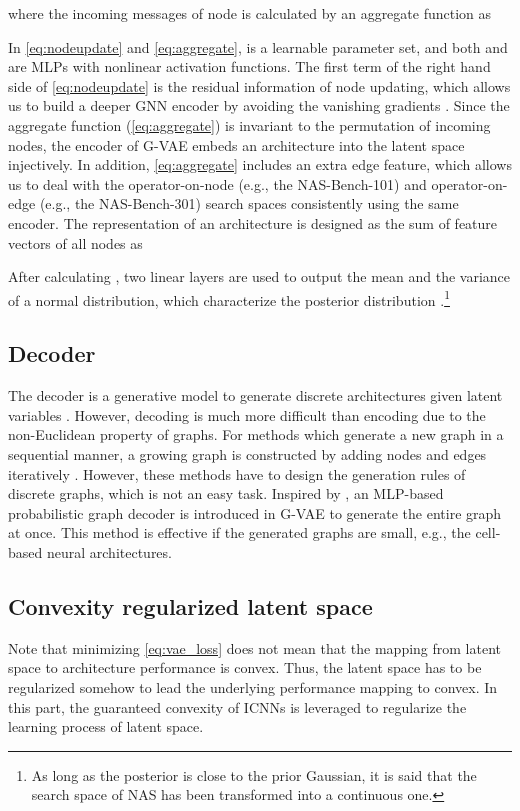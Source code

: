 \documentclass[10pt,twocolumn,letterpaper]{article}
\begin{document}
where the incoming messages  of node  is calculated by an aggregate function as

In \eqref{eq:nodeupdate} and \eqref{eq:aggregate},  is a learnable parameter set, and both  and  are MLPs with nonlinear activation functions. The first term of the right hand side of \eqref{eq:nodeupdate}  is the residual information of node updating, which allows us to build a deeper GNN encoder by avoiding the vanishing gradients \cite{DBLP:conf/cvpr/HeZRS16}. Since the aggregate function (\ref{eq:aggregate}) is invariant to the permutation of incoming nodes, the encoder of G-VAE embeds an architecture into the latent space injectively. In addition, \eqref{eq:aggregate} includes an extra edge feature, which allows us to deal with the operator-on-node (e.g., the NAS-Bench-101) and operator-on-edge (e.g., the NAS-Bench-301) search spaces consistently using the same encoder. The representation of an architecture is designed as the sum of feature vectors of all nodes as 

After calculating , two linear layers are used to output the mean  and the variance  of a normal distribution, which characterize the posterior distribution .\footnote{As long as the posterior is close to the prior Gaussian, it is said that the search space of NAS has been transformed into a continuous one.}

\subsection{Decoder} 
The decoder is a generative model to generate discrete architectures given latent variables . However, decoding is much more difficult than encoding due to the non-Euclidean property of graphs. For methods which generate a new graph in a sequential manner, a growing graph is constructed by adding nodes and edges iteratively \cite{DBLP:conf/nips/ZhangJCGC19, you2018graphrnn}. However, these methods have to design the generation rules of discrete graphs, which is not an easy task. Inspired by \cite{simonovsky2018graphvae}, an MLP-based probabilistic graph decoder is introduced in G-VAE to generate the entire graph at once. This method is effective if the generated graphs are small, e.g., the cell-based neural architectures. 

\subsection{Convexity regularized latent space}
Note that minimizing \eqref{eq:vae_loss} does not mean that the mapping from latent space to architecture performance is convex. Thus, the latent space has to be regularized somehow to lead the underlying performance mapping to convex. In this part, the guaranteed convexity of ICNNs is leveraged to regularize the learning process of latent space. 	
\end{document}
